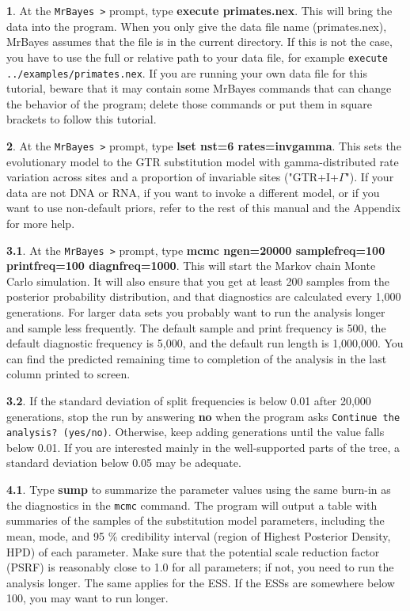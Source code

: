 \documentclass[12pt]{book}
\begin{document}
\textbf{1}. At the \texttt{MrBayes >} prompt, type \textbf{execute primates.nex}. This will bring the data
 into the program. When you only give the data file name (primates.nex), MrBayes assumes that the file is in
 the current directory. If this is not the case, you have to use the full or relative path to your data file,
 for example \texttt{execute ../examples/primates.nex}. If you are running your own data file for this tutorial,
 beware that it may contain some MrBayes commands that can change the behavior of the program; delete those
 commands or put them in square brackets to follow this tutorial. 

\textbf{2}. At the \texttt{MrBayes >} prompt, type \textbf{lset nst=6 rates=invgamma}. This sets the 
evolutionary model to the GTR substitution model with gamma-distributed rate variation across sites and a
 proportion of invariable sites ("GTR+I+$\Gamma$"). If your data are not DNA or RNA, if you want to invoke a different model,
 or if you want to use non-default priors, refer to the rest of this manual and the Appendix for more help.

\textbf{3.1}. At the \texttt{MrBayes >} prompt, type \textbf{mcmc ngen=20000 samplefreq=100 printfreq=100
 diagnfreq=1000}. This will start the Markov chain Monte Carlo simulation. It will also ensure that you 
 get at least 200 samples from the posterior probability distribution, and that diagnostics are
 calculated every 1,000 generations. For larger data sets you probably want to run the analysis longer 
 and sample less frequently. The default sample and print frequency is 500, the default diagnostic 
 frequency is 5,000, and the default run length is 1,000,000. You can find the predicted remaining 
 time to completion of the analysis in the last column printed to screen.

\textbf{3.2}. If the standard deviation of split frequencies is below 0.01 after 20,000 generations,
 stop the run by answering \textbf{no} when the program asks \texttt{Continue the analysis? (yes/no)}.
 Otherwise, keep adding generations until the value falls below 0.01. If you are interested mainly in
 the well-supported parts of the tree, a standard deviation below 0.05 may be adequate.

\textbf{4.1}. Type \textbf{sump} to summarize the parameter values using the same burn-in as the
 diagnostics in the \texttt{mcmc} command. The program will output a table with summaries of the samples
 of the substitution model parameters, including the mean, mode, and 95 \% credibility interval
 (region of Highest Posterior Density, HPD) of each parameter. Make sure that the potential scale reduction
 factor (PSRF) is reasonably close to 1.0 for all parameters; if not, you need to run the analysis longer.
 The same applies for the ESS. If the ESSs are somewhere below 100, you may want to run longer.
\end{document}
